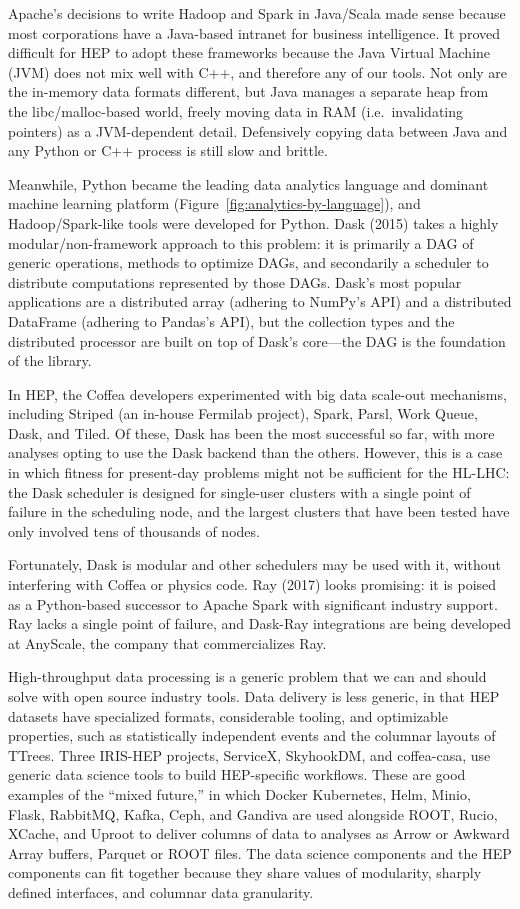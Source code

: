 \documentclass{article}
\begin{document}
Apache's decisions to write Hadoop and Spark in Java/Scala made sense because most corporations have a Java-based intranet for business intelligence. It proved difficult for HEP to adopt these frameworks because the Java Virtual Machine (JVM) does not mix well with C++, and therefore any of our tools. Not only are the in-memory data formats different, but Java manages a separate heap from the libc/malloc-based world, freely moving data in RAM (i.e.\ invalidating pointers) as a JVM-dependent detail. Defensively copying data between Java and any Python or C++ process is still slow and brittle.

Meanwhile, Python became the leading data analytics language and dominant machine learning platform (Figure~\ref{fig:analytics-by-language}), and Hadoop/Spark-like tools were developed for Python. Dask (2015) takes a highly modular/non-framework approach to this problem: it is primarily a DAG of generic operations, methods to optimize DAGs, and secondarily a scheduler to distribute computations represented by those DAGs. Dask's most popular applications are a distributed array (adhering to NumPy's API) and a distributed DataFrame (adhering to Pandas's API), but the collection types and the distributed processor are built on top of Dask's core---the DAG is the foundation of the library.

In HEP, the Coffea developers experimented with big data scale-out mechanisms, including Striped (an in-house Fermilab project), Spark, Parsl, Work Queue, Dask, and Tiled. Of these, Dask has been the most successful so far, with more analyses opting to use the Dask backend than the others. However, this is a case in which fitness for present-day problems might not be sufficient for the HL-LHC: the Dask scheduler is designed for single-user clusters with a single point of failure in the scheduling node, and the largest clusters that have been tested have only involved tens of thousands of nodes.

Fortunately, Dask is modular and other schedulers may be used with it, without interfering with Coffea or physics code. Ray (2017) looks promising: it is poised as a Python-based successor to Apache Spark with significant industry support. Ray lacks a single point of failure, and Dask-Ray integrations are being developed at AnyScale, the company that commercializes Ray.

High-throughput data processing is a generic problem that we can and should solve with open source industry tools. Data delivery is less generic, in that HEP datasets have specialized formats, considerable tooling, and optimizable properties, such as statistically independent events and the columnar layouts of TTrees. Three IRIS-HEP projects, ServiceX, SkyhookDM, and coffea-casa, use generic data science tools to build HEP-specific workflows. These are good examples of the ``mixed future,'' in which Docker Kubernetes, Helm, Minio, Flask, RabbitMQ, Kafka, Ceph, and Gandiva are used alongside ROOT, Rucio, XCache, and Uproot to deliver columns of data to analyses as Arrow or Awkward Array buffers, Parquet or ROOT files. The data science components and the HEP components can fit together because they share values of modularity, sharply defined interfaces, and columnar data granularity.
\end{document}

